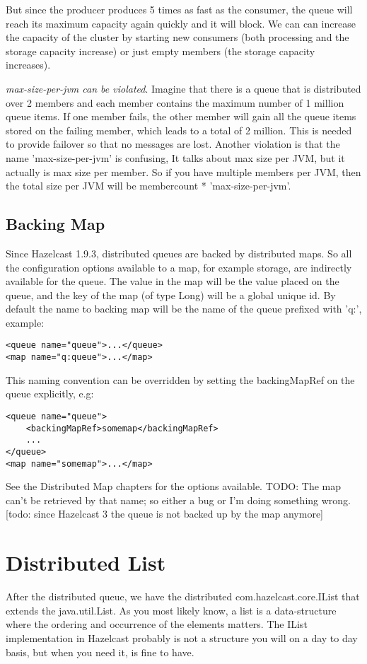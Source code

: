 But since the producer produces 5 times as fast as the consumer, the queue will reach its maximum capacity again quickly and it will block. We can can increase the capacity of the cluster by starting new consumers (both processing and the storage capacity increase) or just empty members (the storage capacity increases).

\emph{max-size-per-jvm can be violated}. Imagine that there is a queue that is distributed over 2 members and each member contains the maximum number of 1 million queue items. If one member fails, the other member will gain all the queue items stored on the failing member, which leads to a total of 2 million. This is needed to provide failover so that no messages are lost. Another violation is that the name 'max-size-per-jvm' is confusing, It talks about max size per JVM, but it actually is max size per member. So if you have multiple members per JVM, then the total size per JVM will be membercount * 'max-size-per-jvm'.

\subsection{Backing Map}
Since Hazelcast 1.9.3, distributed queues are backed by distributed maps. So all the configuration options available to a map, for example storage, are indirectly available for the queue. The value in the map will be the value placed on the queue, and the key of the map (of type Long) will be a global unique id. By default the name to backing map will be the name of the queue prefixed with 'q:', example:
\begin{lstlisting}
<queue name="queue">...</queue>
<map name="q:queue">...</map>
\end{lstlisting}

This naming convention can be overridden by setting the backingMapRef on the queue explicitly, e.g:
\begin{lstlisting}
<queue name="queue">
    <backingMapRef>somemap</backingMapRef>
    ... 
</queue>
<map name="somemap">...</map>
\end{lstlisting}
See the Distributed Map chapters for the options available.
TODO: The map can't be retrieved by that name; so either a bug or I'm doing something wrong.
[todo: since Hazelcast 3 the queue is not backed up by the map anymore]

\section{Distributed List}
After the distributed queue, we have the distributed com.hazelcast.core.IList that extends the java.util.List. As you most likely know, a list is a data-structure where the ordering and occurrence of the elements matters. The IList implementation in Hazelcast probably is not a structure you will on a day to day basis, but when you need it, is fine to have.

